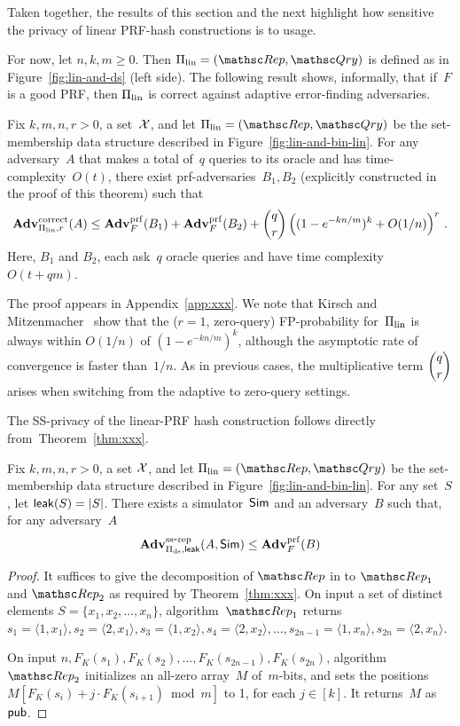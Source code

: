 Taken together, the results of this section and the next highlight how sensitive the privacy of linear PRF-hash constructions is to usage.


For now, let $n,k,m \geq 0$.  Then $\setprim_{\mathrm{lin}}= (\Rep, \Qry)$ is defined as in Figure~\ref{fig:lin-and-ds} (left side).  The following result shows, informally, that if~$F$ is a good PRF, then $\Pi_{\mathrm{lin}}$ is correct against adaptive error-finding adversaries.

\begin{theorem}\label{thm1}\label{thm:lin-correctness}
Fix $k,m,n,r>0$, a set~${\cal X}$, and let $\setprim_{\mathrm{lin}}= (\Rep, \Qry)$ be the set-membership data structure described in Figure~\ref{fig:lin-and-bin-lin}.  For any adversary~$A$ that makes a total of~$q$ queries to its oracle and has time-complexity~$O(t)$, there exist prf-adversaries~$B_1,B_2$ (explicitly constructed in the proof of this theorem) such that
\[
\mathrm{\mathbf{Adv}}^{\mathrm{correct}}_{\Pi_{\mathrm{lin}},r}(A) \leq  \mathbf{Adv}^{\mathrm{prf}}_{F}(B_1) + \mathbf{Adv}^{\mathrm{prf}}_{F}(B_2)  +{\dbinom{q}{r}} \left( (1-e^{-kn/m})^k + O(1/n) \right)^r\,.
\]
Here, $B_1$ and $B_2$, each ask~$q$ oracle queries and have time complexity~$O(t+qm)$.
\end{theorem}
The proof appears in Appendix~\ref{app:xxx}.  We note that Kirsch and Mitzenmacher~\cite{xxx} show
that the ($r=1$, zero-query) FP-probability for~$\Pi_\mathrm{lin}$ is
always within $O(1/n)$ of $(1-e^{-kn/m})^k$, although the asymptotic
rate of convergence is faster than~$1/n$.   As in previous cases, the multiplicative term $\dbinom{q}{r}$ arises when switching from the adaptive to zero-query settings.

The SS-privacy of the linear-PRF hash construction follows directly from~Theorem~\ref{thm:xxx}.
\begin{theorem}\label{thm:lin-privacy}
Fix $k,m,n,r>0$, a set ${\cal X}$, and let $\setprim_{\mathrm{lin}}= (\Rep, \Qry)$ be the set-membership data structure described in Figure~\ref{fig:lin-and-bin-lin}. For any set~$S$, let ${\sf leak}(S)=|S|$.  There exists a simulator~${\sf Sim}$ and an adversary~$B$ such that, for any adversary~$A$
\[
\mathrm{\mathbf{Adv}}^{\mathrm{ss\mbox{-}rep}}_{\Pi_{\mathrm{ds}},{\sf leak}}(A,{\sf Sim}) \leq  \mathbf{Adv}^{\mathrm{prf}}_{F}(B)
\]
\end{theorem}
\begin{proof}
It suffices to give the decomposition of $\Rep$ in to $\Rep_1$ and $\Rep_2$ as required by Theorem~\ref{thm:xxx}.
On input a set of distinct elements
$S=\{x_1,x_2,\ldots,x_n\}$, algorithm~$\Rep_1$ returns $s_1=\langle 1,x_1 \rangle, s_2=\langle 2,x_1 \rangle, s_3 = \langle 1,x_2\rangle, s_4=\langle 2,x_2 \rangle,\ldots,s_{2n-1}=\langle 1,x_n \rangle, s_{2n}=\langle 2,x_n \rangle$.

On input $n,F_K(s_1),F_K(s_2),\ldots,F_K(s_{2n-1}) , F_K(s_{2n})$, algorithm $\Rep_2$ initializes an all-zero array~$M$ of~$m$-bits, and sets the positions $M[F_K(s_i)+j\cdot F_K(s_{i+1})\bmod m]$ to 1, for each $j \in [k]$.  It returns~$M$ as ${\sf pub}$.
\end{proof}


